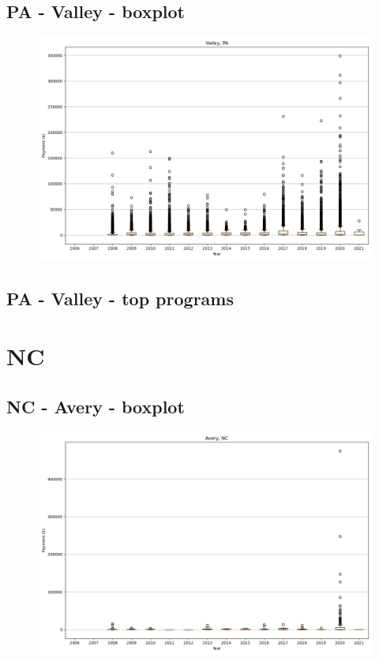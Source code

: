 \subsection*{PA - Valley - boxplot}
\begin{figure}[h]
\centering
\includegraphics[width=7in]{../output/boxplots/counties/Valley-PA_boxplot.png}
\end{figure}


\subsection*{PA - Valley - top programs}

\newpage
\section*{NC}
\subsection*{NC - Avery - boxplot}
\begin{figure}[h]
\centering
\includegraphics[width=7in]{../output/boxplots/counties/Avery-NC_boxplot.png}
\end{figure}


